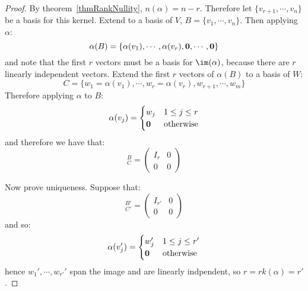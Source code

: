 \documentclass[../Main.tex]{subfiles}
\begin{document}
\begin{proof}
    By theorem~\ref{thmRankNullity}, $n(\alpha) = n-r$. Therefore let $\{v_{r+1}, \cdots, v_n\}$ be a basis for this kernel. Extend to a basis of $V$, $B = \{v_1, \cdots, v_n\}$. Then applying $\alpha$:
    \begin{equation*}
        \alpha(B) = \{\alpha(v_1), \cdots, \alpha(v_r), \boldsymbol{0}, \cdots, \boldsymbol{0}\}
    \end{equation*}
    and note that the first $r$ vectors must be a basis for $\im(\alpha)$, because there are $r$ linearly independent vectors. Extend the first $r$ vectors of $\alpha(B)$ to a basis of $W$:
    \begin{equation*}
        C = \{w_1 = \alpha(v_1), \cdots, w_r = \alpha(v_r), w_{r+1}, \cdots, w_m\}
    \end{equation*}
    Therefore applying $\alpha$ to $B$:
    \begin{equation*}
        \alpha(v_j) =
        \begin{cases}
            w_j & 1 \leq j \leq r \\
            \boldsymbol{0} & \text{otherwise}
        \end{cases}
    \end{equation*}
    and therefore we have that:
    \begin{equation*}
        [\alpha]_C^B =
        \begin{pmatrix}
            I_r & 0 \\
            0 & 0
        \end{pmatrix}
    \end{equation*}

    Now prove uniqueness. Suppose that:
    \begin{equation*}
        [\alpha]_{C'}^{B'} =
        \begin{pmatrix}
            I_{r'} & 0 \\
            0 & 0
        \end{pmatrix}
    \end{equation*}
    and so:
    \begin{equation*}
        \alpha(v_j') =
        \begin{cases}
            w_j' & 1 \leq j \leq r' \\
            \boldsymbol{0} & \text{otherwise}
        \end{cases}
    \end{equation*}
    hence $w_1', \cdots, w_{r'}'$ span the image and are linearly indpendent, so $r = rk(\alpha) = r'$.
\end{proof}
\end{document}
